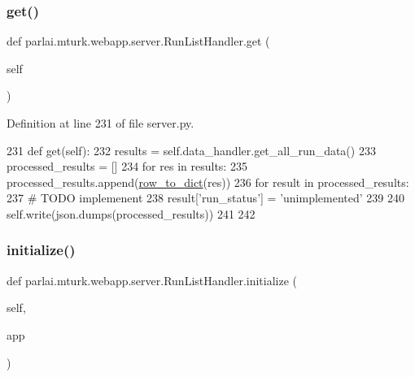 \subsubsection{\texorpdfstring{get()}{get()}}
{\footnotesize\ttfamily def parlai.\+mturk.\+webapp.\+server.\+Run\+List\+Handler.\+get (\begin{DoxyParamCaption}\item[{}]{self }\end{DoxyParamCaption})}



Definition at line 231 of file server.\+py.


\begin{DoxyCode}
231     \textcolor{keyword}{def }get(self):
232         results = self.data\_handler.get\_all\_run\_data()
233         processed\_results = []
234         \textcolor{keywordflow}{for} res \textcolor{keywordflow}{in} results:
235             processed\_results.append(\hyperlink{namespaceparlai_1_1mturk_1_1webapp_1_1server_a92be47964fa33a4b6a14d4069d091c7d}{row\_to\_dict}(res))
236         \textcolor{keywordflow}{for} result \textcolor{keywordflow}{in} processed\_results:
237             \textcolor{comment}{# TODO implemenent}
238             result[\textcolor{stringliteral}{'run\_status'}] = \textcolor{stringliteral}{'unimplemented'}
239 
240         self.write(json.dumps(processed\_results))
241 
242 
\end{DoxyCode}
\mbox{\label{classparlai_1_1mturk_1_1webapp_1_1server_1_1RunListHandler_aea5350b7ea1536cacfc3dfff4ffe1f32}} 
\subsubsection{\texorpdfstring{initialize()}{initialize()}}
{\footnotesize\ttfamily def parlai.\+mturk.\+webapp.\+server.\+Run\+List\+Handler.\+initialize (\begin{DoxyParamCaption}\item[{}]{self,  }\item[{}]{app }\end{DoxyParamCaption})}



